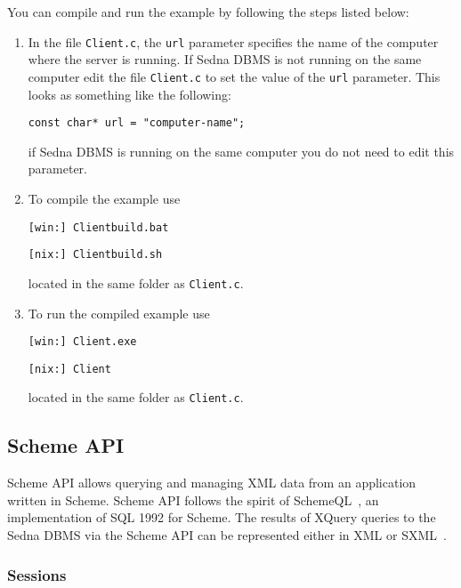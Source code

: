 \documentclass[a4paper,12pt]{article}
\begin{document}
You can compile and run the example by following the steps listed below:
\begin{enumerate}
\item In the file \verb!Client.c!, the \verb!url! parameter specifies the
 name of the computer where the server is running. If Sedna DBMS is not running
 on the same computer edit the file \verb!Client.c! to set the value of the \verb!url!
 parameter.
 This looks as something like the following:
 \begin{verbatim}const char* url = "computer-name";\end{verbatim}

if Sedna DBMS is running on the same computer you do not need to edit this parameter.

\item To compile the example use
\begin{verbatim}
[win:] Clientbuild.bat
\end{verbatim}
\begin{verbatim}
[nix:] Clientbuild.sh
\end{verbatim}
located in the same folder as \verb!Client.c!.

\item To run the compiled example use
\begin{verbatim}
[win:] Client.exe
\end{verbatim}
\begin{verbatim}
[nix:] Client
\end{verbatim}
located in the same folder as \verb!Client.c!.
\end{enumerate}





%
%
\subsection{Scheme API}

Scheme API allows querying and managing XML data from an application written
in Scheme.
Scheme API follows the spirit of SchemeQL~\cite{paper:scheme-ql}, an
implementation of SQL 1992 for Scheme.
The results of XQuery queries to the Sedna DBMS via the Scheme API can be
represented either in XML or SXML~\cite{paper:sxml}.

\subsubsection{Sessions}
\end{document}
